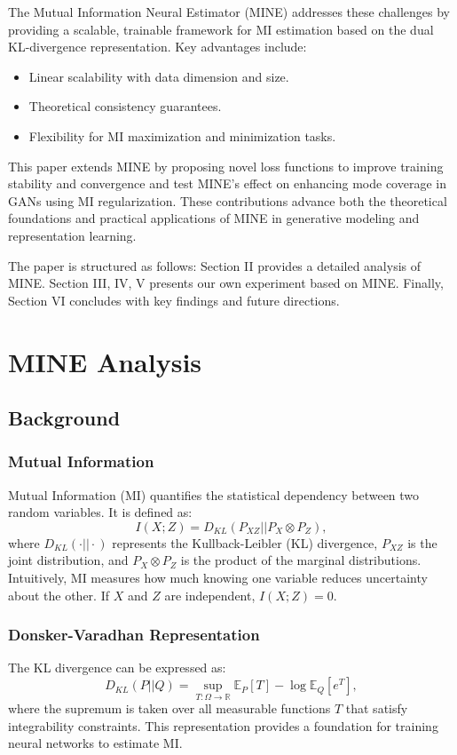 \documentclass[lettersize,journal]{IEEEtran}
\begin{document}
The Mutual Information Neural Estimator (MINE) addresses these challenges by providing a scalable, trainable framework for MI estimation based on the dual KL-divergence representation. Key advantages include:
\begin{itemize}
    \item Linear scalability with data dimension and size.
    \item Theoretical consistency guarantees.
    \item Flexibility for MI maximization and minimization tasks.
\end{itemize}

This paper extends MINE by proposing novel loss functions to improve training stability and convergence and test MINE's effect on enhancing mode coverage in GANs using MI regularization.
These contributions advance both the theoretical foundations and practical applications of MINE in generative modeling and representation learning.

The paper is structured as follows: Section II provides a detailed analysis of MINE. Section III, IV, V presents our own experiment based on MINE. Finally, Section VI concludes with key findings and future directions.

\section{MINE Analysis}

\subsection{Background}
\subsubsection{Mutual Information}
Mutual Information (MI) quantifies the statistical dependency between two random variables. It is defined as:
\begin{equation}
    I(X; Z) = D_{KL}(P_{XZ} || P_X \otimes P_Z),
\end{equation}
where $D_{KL}(\cdot || \cdot)$ represents the Kullback-Leibler (KL) divergence, $P_{XZ}$ is the joint distribution, and $P_X \otimes P_Z$ is the product of the marginal distributions. Intuitively, MI measures how much knowing one variable reduces uncertainty about the other. If $X$ and $Z$ are independent, $I(X; Z) = 0$.

\subsubsection{Donsker-Varadhan Representation}
The KL divergence can be expressed as:
\begin{equation}
    D_{KL}(P || Q) = \sup_{T: \Omega \to \mathbb{R}} \mathbb{E}_P[T] - \log \mathbb{E}_Q[e^T],
\end{equation}
where the supremum is taken over all measurable functions $T$ that satisfy integrability constraints. This representation provides a foundation for training neural networks to estimate MI.
\end{document}
